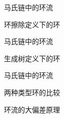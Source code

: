 \documentclass{beamer}
\begin{document}
	\begin{frame}{马氏链中的环流}
		\begin{block}{环擦除定义下的环}
			\begin{table}[htb!]
				\renewcommand \arraystretch{1} \centering
				\caption{导出链的变化过程和轨道中形成的环}\label{trajectory}
			\end{table}
		\end{block}

	\end{frame}

	\begin{frame}{马氏链中的环流}
		\begin{block}{生成树定义下的环}

			
		\end{block}
		
	\end{frame}

	\begin{frame}{马氏链中的环流}
		\begin{block}{两种类型环的比较}

			
		\end{block}
		
	\end{frame}

	\begin{frame}{环流的大偏差原理}
		
	\end{frame}
\end{document}
